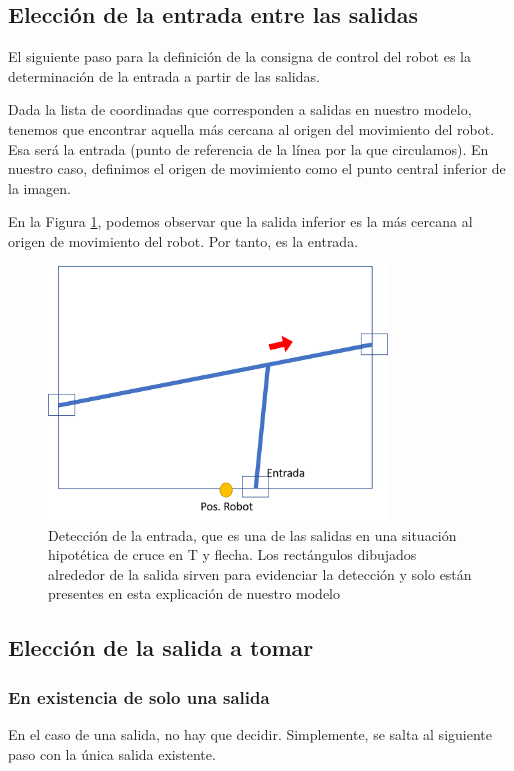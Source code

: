 \documentclass{article}
\begin{document}
    \subsection{Elección de la entrada entre las salidas}
        El siguiente paso para la definición de la consigna de control del robot es la determinación de la entrada a partir de las salidas.

        Dada la lista de coordinadas que corresponden a salidas en nuestro modelo, tenemos que encontrar aquella más cercana al origen del movimiento del robot. Esa será la entrada (punto de referencia de la línea por la que circulamos). En nuestro caso, definimos el origen de movimiento como el punto central inferior de la imagen.

        En la Figura \ref{fig:consigna3}, podemos observar que la salida inferior es la más cercana al origen de movimiento del robot. Por tanto, es la entrada.

        \begin{figure}[H]
            \centering
            \includegraphics[width=9cm]{figures/consigna3.png}
            \caption{Detección de la entrada, que es una de las salidas en una situación hipotética de cruce en T y flecha. Los rectángulos dibujados alrededor de la salida sirven para evidenciar la detección y solo están presentes en esta explicación de nuestro modelo}
            \label{fig:consigna3}
        \end{figure}


    \subsection{Elección de la salida a tomar}
        \subsubsection{En existencia de solo una salida}
            En el caso de una salida, no hay que decidir. Simplemente, se salta al siguiente paso con la única salida existente.
\end{document}
